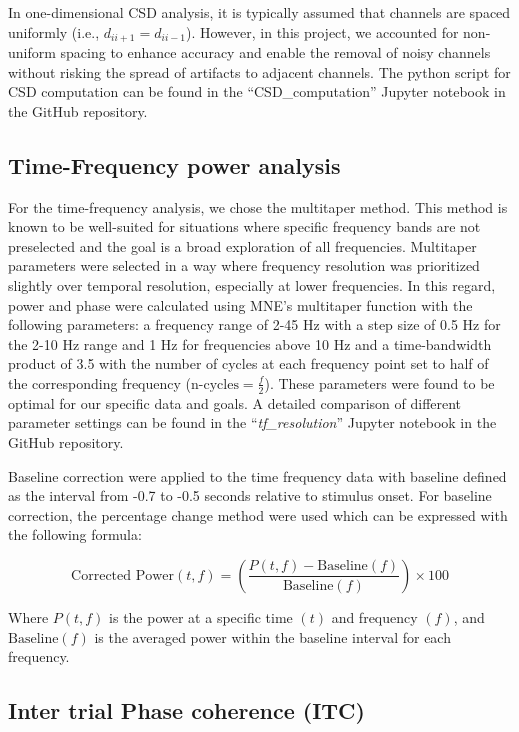\documentclass[
  letterpaper,
  DIV=11,
  numbers=noendperiod]{scrartcl}
\begin{document}
In one-dimensional CSD analysis, it is typically assumed that channels
are spaced uniformly (i.e., \(d_{i i+1} = d_{i i-1}\)). However, in this
project, we accounted for non-uniform spacing to enhance accuracy and
enable the removal of noisy channels without risking the spread of
artifacts to adjacent channels. The python script for CSD computation
can be found in the ``CSD\_computation'' Jupyter notebook in the GitHub
repository.

\subsection{Time-Frequency power
analysis}\label{time-frequency-power-analysis}

For the time-frequency analysis, we chose the multitaper method. This
method is known to be well-suited for situations where specific
frequency bands are not preselected and the goal is a broad exploration
of all frequencies. Multitaper parameters were selected in a way where
frequency resolution was prioritized slightly over temporal resolution,
especially at lower frequencies. In this regard, power and phase were
calculated using MNE's multitaper function with the following
parameters: a frequency range of 2-45 Hz with a step size of 0.5 Hz for
the 2-10 Hz range and 1 Hz for frequencies above 10 Hz and a
time-bandwidth product of 3.5 with the number of cycles at each
frequency point set to half of the corresponding frequency
(\(\text{n-cycles} = \frac{f}{2}\)). These parameters were found to be
optimal for our specific data and goals. A detailed comparison of
different parameter settings can be found in the
``\emph{tf\_resolution}'' Jupyter notebook in the GitHub repository.

Baseline correction were applied to the time frequency data with
baseline defined as the interval from -0.7 to -0.5 seconds relative to
stimulus onset. For baseline correction, the percentage change method
were used which can be expressed with the following formula:

\[
\text{Corrected Power}(t,f) = (\frac{P(t,f)-\text{Baseline}(f)}{\text{Baseline}(f)}) \times 100 
\]

Where \(P(t,f)\) is the power at a specific time \((t)\) and frequency
\((f)\), and \(\text{Baseline}(f)\) is the averaged power within the
baseline interval for each frequency.

\subsection{Inter trial Phase coherence
(ITC)}\label{inter-trial-phase-coherence-itc}
\end{document}
